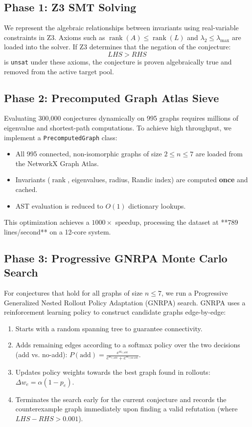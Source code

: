 \documentclass[11pt,letterpaper]{article}
\begin{document}
\subsection{Phase 1: Z3 SMT Solving}
We represent the algebraic relationships between invariants using real-variable constraints in Z3. Axioms such as $\operatorname{rank}(A) \le \operatorname{rank}(L)$ and $\lambda_2 \le \lambda_{\max}$ are loaded into the solver. If Z3 determines that the negation of the conjecture:
\begin{equation}
    LHS > RHS
\end{equation}
is \texttt{unsat} under these axioms, the conjecture is proven algebraically true and removed from the active target pool.

\subsection{Phase 2: Precomputed Graph Atlas Sieve}
Evaluating 300,000 conjectures dynamically on 995 graphs requires millions of eigenvalue and shortest-path computations. To achieve high throughput, we implement a \texttt{PrecomputedGraph} class:
\begin{itemize}
    \item All 995 connected, non-isomorphic graphs of size $2 \le n \le 7$ are loaded from the NetworkX Graph Atlas.
    \item Invariants ($\operatorname{rank}$, eigenvalues, radius, Randic index) are computed \textbf{once} and cached.
    \item AST evaluation is reduced to $O(1)$ dictionary lookups.
\end{itemize}
This optimization achieves a $1000\times$ speedup, processing the dataset at **789 lines/second** on a 12-core system.

\subsection{Phase 3: Progressive GNRPA Monte Carlo Search}
For conjectures that hold for all graphs of size $n \le 7$, we run a Progressive Generalized Nested Rollout Policy Adaptation (GNRPA) search. GNRPA uses a reinforcement learning policy to construct candidate graphs edge-by-edge:
\begin{enumerate}
    \item Starts with a random spanning tree to guarantee connectivity.
    \item Adds remaining edges according to a softmax policy over the two decisions (add vs. no-add): $P(\text{add}) = \frac{e^{w_{e, \text{add}}}}{e^{w_{e, \text{add}}} + e^{w_{e, \text{no-add}}}}$.
    \item Updates policy weights towards the best graph found in rollouts: $\Delta w_e = \alpha(1 - p_e)$.
    \item Terminates the search early for the current conjecture and records the counterexample graph immediately upon finding a valid refutation (where $LHS - RHS > 0.001$).
\end{enumerate}
\end{document}
